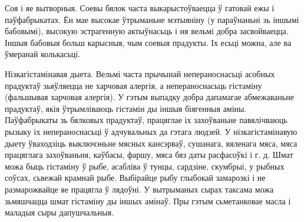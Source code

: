 Соя і яе вытворныя.
Соевы бялок часта выкарыстоўваецца ў гатовай ежы і паўфабрыкатах. Ён мае высокае ўтрыманьне мэтыяніну (у параўнаньні зь іншымі бабовымі), высокую эстрагенную актыўнасьць і ня вельмі добра засвойваецца. Іншыя бабовыя больш карысныя, чым соевыя прадукты. Іх есьці можна, але ва ўмеранай колькасьці.

Нізкагістамінавая дыета.
Вельмі часта прычынай непераноснасьці асобных прадуктаў зьяўляецца не харчовая алергія, а непераноснасьць гістаміну (фальшывая харчовая алергія). У гэтым выпадку добра дапамагае абмежаваньне прадуктаў, якія ўтрымліваюць гістамін ды іншыя біягенныя аміны. Паўфабрыкаты зь бялковых прадуктаў, працяглае іх захоўваньне павялічваюць рызыку іх непераноснасьці ў адчувальных да гэтага людзей. У нізкагістамінавую дыету ўваходзіць выключэньне мясных кансэрваў, сушанага, вяленага мяса, мяса працяглага захоўваньня, каўбасы, фаршу, мяса бяз даты расфасоўкі і г. д. Шмат можа быць гістаміну ў рыбе, асабліва ў тунцы, сардзіне, скумбрыі, у рыбных соўсах, сьвежай крамнай рыбе. Выбірайце рыбу глыбокай замарозкі і не размарожвайце яе працягла ў лядоўні. У вытрыманых сырах таксама можа зьмяшчацца шмат гістаміну ды іншых амінаў. Пры гэтым сьметанковае масла і маладыя сыры дапушчальныя.

